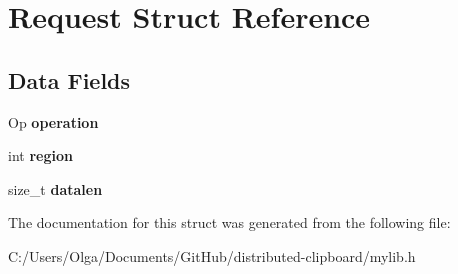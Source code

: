 \hypertarget{struct_request}{}\section{Request Struct Reference}
\label{struct_request}
\subsection*{Data Fields}
\begin{DoxyCompactItemize}
\item 
\mbox{\label{struct_request_ae7f9ec467b484df17933b3b9d53eb1f4}} 
Op {\bfseries operation}
\item 
\mbox{\label{struct_request_ae65983b9419c48cac6d5b2340adaa501}} 
int {\bfseries region}
\item 
\mbox{\label{struct_request_a3d12e161726566d24a1d0cf6c6b416bb}} 
size\+\_\+t {\bfseries datalen}
\end{DoxyCompactItemize}


The documentation for this struct was generated from the following file\+:\begin{DoxyCompactItemize}
\item 
C\+:/\+Users/\+Olga/\+Documents/\+Git\+Hub/distributed-\/clipboard/mylib.\+h\end{DoxyCompactItemize}
